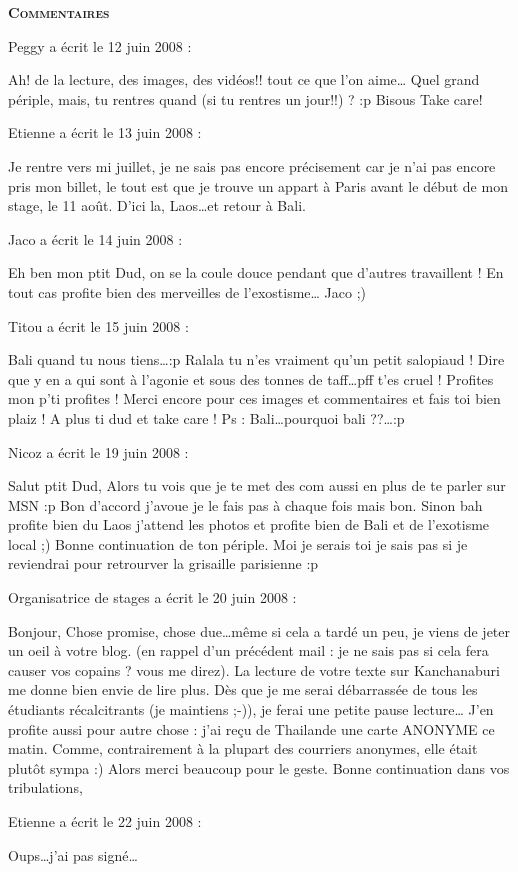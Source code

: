 \bigskip
\textbf{\textsc{Commentaires}}

\medskip
Peggy a écrit le 12 juin 2008 :
\begin{displayquote}
Ah! de la lecture, des images, des vidéos!! tout ce que l'on aime\dots
Quel grand périple, mais, tu rentres quand (si tu rentres un jour!!) ? :p
Bisous
Take care!
\end{displayquote}

\medskip
Etienne a écrit le 13 juin 2008 :
\begin{displayquote}
Je rentre vers mi juillet, je ne sais pas encore précisement car je n'ai pas encore pris mon billet, le tout est que je trouve un appart à Paris avant le début de mon stage, le 11 août.
D'ici la, Laos\dots et retour à Bali.
\end{displayquote}

\medskip
Jaco a écrit le 14 juin 2008 :
\begin{displayquote}
Eh ben mon ptit Dud, on se la coule douce pendant que d'autres travaillent !
En tout cas profite bien des merveilles de l'exostisme\dots
Jaco ;)
\end{displayquote}

\medskip
Titou a écrit le 15 juin 2008 :
\begin{displayquote}
Bali quand tu nous tiens\dots :p
Ralala tu n'es vraiment qu'un petit salopiaud ! Dire que y en a qui sont à l'agonie et sous des tonnes de taff\dots pff t'es cruel !
Profites mon p'ti profites !
Merci encore pour ces images et commentaires et fais toi bien plaiz !
A plus ti dud et take care !
Ps : Bali\dots pourquoi bali ??\dots :p
\end{displayquote}

\medskip
Nicoz a écrit le 19 juin 2008 :
\begin{displayquote}
Salut ptit Dud,
Alors tu vois que je te met des com aussi en plus de te parler sur MSN :p
Bon d'accord j'avoue je le fais pas à chaque fois mais bon.
Sinon bah profite bien du Laos j'attend les photos et profite bien de Bali et de l'exotisme local ;)
Bonne continuation de ton périple.
Moi je serais toi je sais pas si je reviendrai pour retrourver la grisaille parisienne :p
\end{displayquote}

\medskip
Organisatrice de stages a écrit le 20 juin 2008 :
\begin{displayquote}
Bonjour,
Chose promise, chose due\dots même si cela a tardé un peu, je viens de jeter un oeil à votre blog. (en rappel d'un précédent mail : je ne sais pas si cela fera causer vos copains ? vous me direz).
La lecture de votre texte sur Kanchanaburi me donne bien envie de lire plus. Dès que je me serai débarrassée de tous les étudiants récalcitrants (je maintiens ;-)), je ferai une petite pause lecture\dots
J'en profite aussi pour autre chose : j'ai reçu de Thailande une carte ANONYME ce matin. Comme, contrairement à la plupart des courriers anonymes, elle était plutôt sympa :) Alors merci beaucoup pour le geste.
Bonne continuation dans vos tribulations,
\end{displayquote}

\medskip
Etienne a écrit le 22 juin 2008 :
\begin{displayquote}
Oups\dots j'ai pas signé\dots
\end{displayquote}

\vfill
